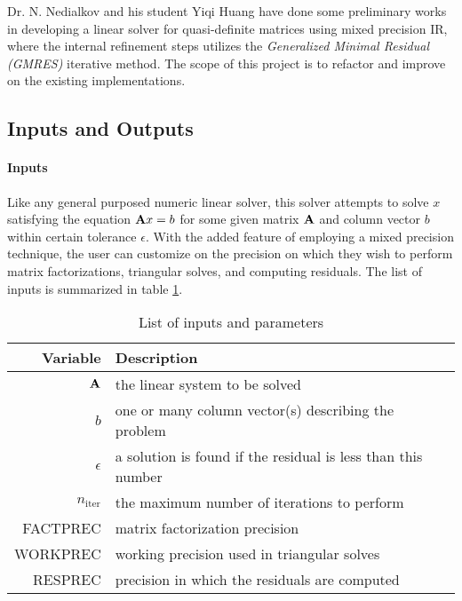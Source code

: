 \documentclass{article}
\begin{document}
Dr. N. Nedialkov and his student Yiqi Huang have done some preliminary works in
developing a linear solver for quasi-definite matrices using mixed precision IR,
where the internal refinement steps utilizes the \emph{Generalized Minimal
  Residual (GMRES)} iterative method. The scope of this project is to refactor
and improve on the existing implementations.

\subsection{Inputs and Outputs}


\paragraph{Inputs}

Like any general purposed numeric linear solver, this solver attempts to solve
\(x\) satisfying the equation \(\mathbf{A}x = b\) for some given matrix
\(\mathbf{A}\) and column vector \(b\) within certain tolerance \(\epsilon\). With the
added feature of employing a mixed precision technique, the user can customize
on the precision on which they wish to perform matrix factorizations, triangular
solves, and computing residuals. The list of inputs is summarized in table
\ref{tab:inputs}.

\begin{table}[hp]
  \centering
  \caption{List of inputs and parameters}
  \label{tab:inputs}
  \begin{tabularx}{1.0\linewidth}{rX}
    \toprule
    \textbf{Variable}  & \textbf{Description} \\
    \midrule
    \(\mathbf{A}\) & the linear system to be solved \\
    \(b\)        & one or many column vector(s) describing the problem \\
    \(\epsilon\)        & a solution is found if the residual is less than this number \\
    \(n_\mathrm{iter}\) & the maximum number of iterations to perform \\
    FACTPREC     & matrix factorization precision \\
    WORKPREC     & working precision used in triangular solves \\
    RESPREC      & precision in which the residuals are computed \\
    \bottomrule
  \end{tabularx}
\end{table}
\end{document}

